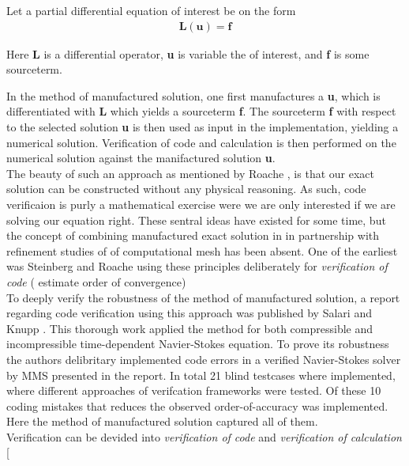 Let a  partial differential equation of interest be on the form
\begin{align*}
\textbf{L}(\textbf{u}) = \textbf{f}
\end{align*}

Here \textbf{L} is a differential operator, \textbf{u} is variable the of interest, and \textbf{f} is some sourceterm.

In the method of manufactured solution, one first manufactures a \textbf{u}, which is differentiated with \textbf{L} which yields a sourceterm  \textbf{f}. The sourceterm \textbf{f} with respect to the selected solution \textbf{u} is then used as input in the implementation, yielding a numerical solution. Verification of code and calculation is then performed on the numerical solution against the manifactured solution \textbf{u}.  \\ 

The beauty of such an approach as mentioned by Roache \cite{Roache2002}, is that our exact solution can be constructed without any physical reasoning. As such, code verificaion is purly a mathematical exercise were we are only interested if we are solving our equation right. These sentral ideas have existed for some time, but the  concept of combining manufactured exact solution in in partnership with refinement studies of of computational mesh has been absent.  One of the earliest was Steinberg and Roache \cite{Steinberg1985} using these principles deliberately for \textit{verification of code} ( estimate order of convergence)\\

To deeply verify the robustness of the method of manufactured solution,  a report regarding code verification using this approach was published by Salari and Knupp \cite{Biggs}. This thorough work applied the method for both compressible and incompressible time-dependent Navier-Stokes equation. To prove its robustness the authors  delibritary implemented  code errors in a verified Navier-Stokes solver by MMS presented in the report. In total 21 blind testcases where implemented, where different approaches of verifcation frameworks were tested. 
Of these 10 coding mistakes that reduces the observed order-of-accuracy was implemented. Here the method of manufactured solution captured all of them. \\

Verification can be devided into \textit{verification of code} and \textit{verification of calculation} [\cite{Roache2002} \cite{Oberkampf2010}


